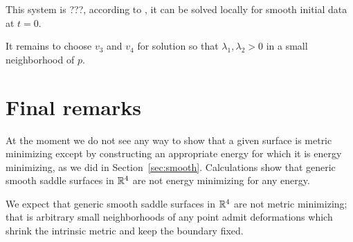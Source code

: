 \documentclass{article}
\begin{document}
This system is ???,
according to \cite[Theorem 3.6]{bressan}, it can be solved locally for smooth initial data at $t=0$.

It remains to choose $v_3$ and $v_4$ for solution so that $\lambda_1, \lambda_2>0$ in a small neighborhood of $p$.
\qeds


\section{Final remarks}


At the moment we do not see any way to show that a given surface is metric minimizing except by constructing an appropriate energy for which it is energy minimizing, as we did in Section~\ref{sec:smooth}.
Calculations show that generic smooth saddle surfaces in $\mathbb{R}^4$ are not energy minimizing for any energy.

We expect that generic smooth saddle surfaces in $\mathbb{R}^4$ are not metric minimizing; that is arbitrary small neighborhoods of any point admit deformations which shrink 
the intrinsic metric and keep the boundary fixed.
\end{document}
